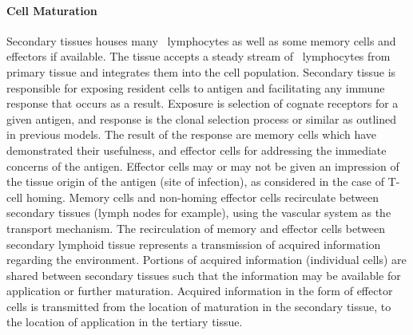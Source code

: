 %
%
\paragraph{Cell Maturation}
Secondary tissues houses many \naive\ lymphocytes as well as some memory cells and effectors if available. The tissue accepts a steady stream of \naive\ lymphocytes from primary tissue and integrates them into the cell population. Secondary tissue is responsible for exposing resident cells to antigen and facilitating any immune response that occurs as a result. Exposure is selection of cognate receptors for a given antigen, and response is the clonal selection process or similar as outlined in previous models. The result of the response are memory cells which have demonstrated their usefulness, and effector cells for addressing the immediate concerns of the antigen. Effector cells may or may not be given an impression of the tissue origin of the antigen (site of infection), as considered in the case of T-cell homing. Memory cells and non-homing effector cells recirculate between secondary tissues (lymph nodes for example), using the vascular system as the transport mechanism. The recirculation of memory and effector cells between secondary lymphoid tissue represents a transmission of acquired information regarding the environment. Portions of acquired information (individual cells) are shared between secondary tissues such that the information may be available for application or further maturation. Acquired information in the form of effector cells is transmitted from the location of maturation in the secondary tissue, to the location of application in the tertiary tissue.

